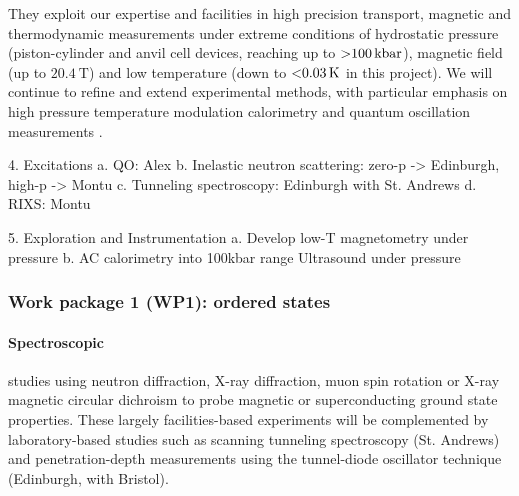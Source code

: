 They exploit our expertise and facilities in high precision transport, magnetic and thermodynamic measurements under extreme conditions of hydrostatic pressure (piston-cylinder and anvil cell devices, reaching up to $\SI{>100}{\kilo\bar}$), magnetic field (up to $\SI{20.4}{\tesla}$) and low temperature (down to $\SI{<0.03}{\kelvin}$ in this project). We will continue to refine and extend experimental methods, with particular emphasis on high pressure temperature modulation calorimetry and quantum oscillation measurements  . %


 
4. Excitations
a. QO: Alex
b. Inelastic neutron scattering: zero-p -> Edinburgh, high-p -> Montu
c. Tunneling spectroscopy: Edinburgh with St. Andrews
d. RIXS: Montu

5. Exploration and Instrumentation
a. Develop low-T magnetometry under pressure
b. AC calorimetry into 100kbar range
Ultrasound under pressure




\subsubsection*{Work package 1 (WP1): ordered states}
\noindent
\paragraph{Spectroscopic} studies using neutron diffraction, X-ray diffraction, muon spin rotation or X-ray magnetic circular dichroism to probe magnetic or superconducting ground state properties. These largely facilities-based experiments will be complemented by laboratory-based studies such as scanning tunneling spectroscopy (St. Andrews) and penetration-depth measurements using the tunnel-diode oscillator technique (Edinburgh, with Bristol).

